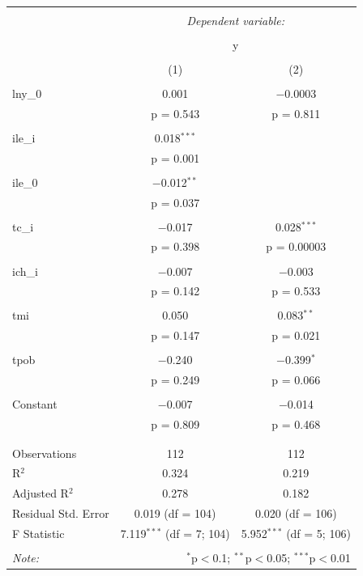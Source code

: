 \begin{table}[!htbp] \centering 
    \tiny
  \caption{} 
  \label{} 
\begin{tabular}{@{\extracolsep{5pt}}lcc} 
\\[-1.8ex]\hline 
\hline \\[-1.8ex] 
 & \multicolumn{2}{c}{\textit{Dependent variable:}} \\ 
\cline{2-3} 
\\[-1.8ex] & \multicolumn{2}{c}{y} \\ 
\\[-1.8ex] & (1) &(2)\\ 
\hline \\[-1.8ex] 
 lny\_0 & 0.001 & $-$0.0003 \\ 
  & p = 0.543 & p = 0.811 \\ 
  & & \\ 
 ile\_i & 0.018$^{***}$ &  \\ 
  & p = 0.001 &  \\ 
  & & \\ 
 ile\_0 & $-$0.012$^{**}$ &  \\ 
  & p = 0.037 &  \\ 
  & & \\ 
 tc\_i & $-$0.017 & 0.028$^{***}$ \\ 
  & p = 0.398 & p = 0.00003 \\ 
  & & \\ 
 ich\_i & $-$0.007 & $-$0.003 \\ 
  & p = 0.142 & p = 0.533 \\ 
  & & \\ 
 tmi & 0.050 & 0.083$^{**}$ \\ 
  & p = 0.147 & p = 0.021 \\ 
  & & \\ 
 tpob & $-$0.240 & $-$0.399$^{*}$ \\ 
  & p = 0.249 & p = 0.066 \\ 
  & & \\ 
 Constant & $-$0.007 & $-$0.014 \\ 
  & p = 0.809 & p = 0.468 \\ 
  & & \\ 
\hline \\[-1.8ex] 
Observations & 112 & 112 \\ 
R$^{2}$ & 0.324 & 0.219 \\ 
Adjusted R$^{2}$ & 0.278 & 0.182 \\ 
Residual Std. Error & 0.019 (df = 104) & 0.020 (df = 106) \\ 
F Statistic & 7.119$^{***}$ (df = 7; 104) & 5.952$^{***}$ (df = 5; 106) \\ 
\hline 
\hline \\[-1.8ex] 
\textit{Note:}  & \multicolumn{2}{r}{$^{*}$p$<$0.1; $^{**}$p$<$0.05; $^{***}$p$<$0.01} \\ 
\end{tabular} 
\end{table} 


